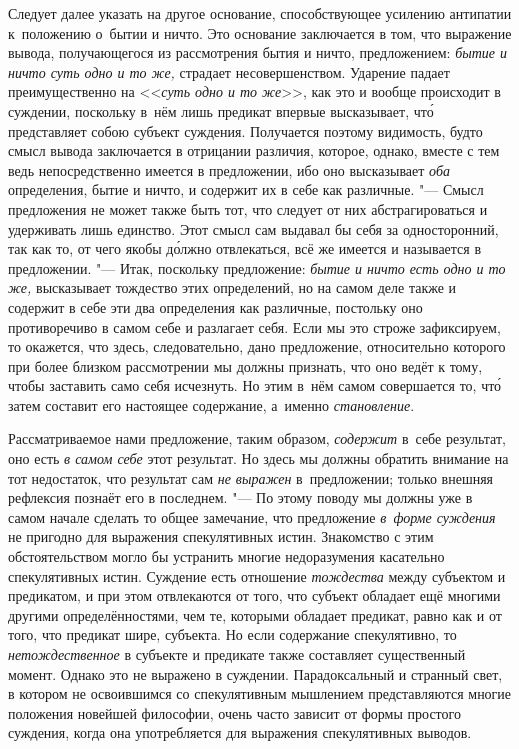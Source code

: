 
Следует далее указать на другое основание, способствующее усилению антипатии
к~положению о~бытии и ничто. Это основание заключается в том, что выражение
вывода, получающегося из рассмотрения бытия и ничто, предложением:
{\em бытие и ничто суть одно и то же,} страдает несовершенством. Ударение
падает преимущественно на <<{\em суть одно и то же}>>, как это и вообще
происходит в суждении, поскольку в~нём лишь предикат впервые высказывает,
чт\'{о} представляет собою субъект суждения. Получается поэтому видимость,
будто смысл вывода заключается в отрицании различия, которое, однако, вместе с
тем ведь непосредственно имеется в предложении, ибо оно высказывает {\em оба}
определения, бытие и ничто, и содержит их в себе как различные. "--- Смысл
предложения не может также быть тот, что следует от них абстрагироваться и
удерживать лишь единство. Этот смысл сам выдавал бы себя за односторонний, так
как то, от чего якобы д\'{о}лжно отвлекаться, всё же имеется и называется в
предложении. "--- Итак, поскольку предложение: {\em бытие и ничто есть одно и
то же,} высказывает тождество этих определений, но на самом деле также и
содержит в себе эти два определения как различные, постольку оно противоречиво
в самом себе и разлагает себя. Если мы это строже зафиксируем, то окажется, что
здесь, следовательно, дано предложение, относительно которого при более близком
рассмотрении мы должны признать, что оно ведёт к тому, чтобы заставить само
себя исчезнуть. Но этим в~нём самом совершается то, чт\'{о} затем составит его
настоящее содержание, а~именно {\em становление}.

Рассматриваемое нами предложение, таким образом, {\em содержит} в~себе
результат, оно есть {\em в самом себе} этот результат. Но здесь мы должны
обратить внимание на тот недостаток, что результат сам {\em не выражен}
в~предложении; только внешняя рефлексия познаёт его в последнем. "--- По этому
поводу мы должны уже в самом начале сделать то общее замечание, что предложение
{\em в~форме суждения} не пригодно для выражения спекулятивных истин.
Знакомство с этим обстоятельством могло бы устранить многие недоразумения
касательно спекулятивных истин. Суждение есть отношение {\em тождества} между
субъектом и предикатом, и при этом отвлекаются от того, что субъект обладает
ещё многими другими определённостями, чем те, которыми обладает предикат, равно
как и от того, что предикат шире, субъекта. Но если содержание спекулятивно, то
{\em нетождественное} в субъекте и предикате также составляет существенный
момент. Однако это не выражено в суждении. Парадоксальный и странный свет, в
котором не освоившимся со спекулятивным мышлением представляются многие
положения новейшей философии, очень часто зависит от формы простого суждения,
когда она употребляется для выражения спекулятивных выводов.

